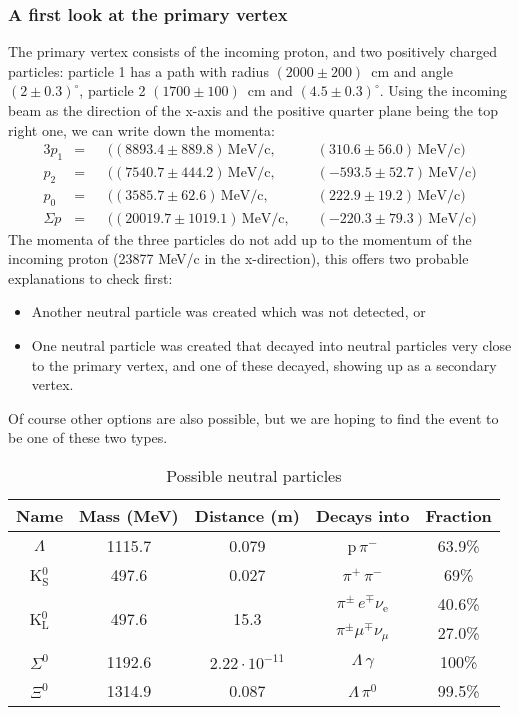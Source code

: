 \documentclass[twocolumn]{article}
\begin{document}
\subsubsection{A first look at the primary vertex}
The primary vertex consists of the incoming proton, and two positively charged particles: particle 1 has a path with radius $(2000 \pm 200)$~cm and angle $(2 \pm 0.3)^{\circ}$, particle 2 $(1700 \pm 100)$~cm and $(4.5 \pm 0.3)^{\circ}$. Using the incoming beam as the direction of the x-axis and the positive quarter plane being the top right one, we can write down the momenta:
\begin{alignat*}{3}
p_1 &= &&((8893.4 \pm 889.8)\, \text{MeV/c},\hspace{3pt} && (310.6 \pm 56.0)\, \text{MeV/c})\\
p_2 &= &&((7540.7 \pm 444.2)\, \text{MeV/c},\hspace{3pt} && (-593.5 \pm 52.7)\, \text{MeV/c})\\
p_0 &= &&((3585.7 \pm 62.6)\, \text{MeV/c},\hspace{3pt} && (222.9 \pm 19.2)\, \text{MeV/c})\\[6pt]
\Sigma p &= &&((20019.7 \pm 1019.1)\, \text{MeV/c},\hspace{3pt} && (-220.3 \pm 79.3)\, \text{MeV/c})
\end{alignat*}
The momenta of the three particles do not add up to the momentum of the incoming proton (23877 MeV/c in the x-direction), this offers two probable explanations to check first:
\begin{itemize}
\item Another neutral particle was created which was not detected, or
\item One neutral particle was created that decayed into neutral particles very close to the primary vertex, and one of these decayed, showing up as a secondary vertex.
\end{itemize}
Of course other options are also possible, but we are hoping to find the event to be one of these two types.\\
\begin{table}
\centering
\begin{tabular}{|c|c|c|c|c|}
\hline
Name & Mass (MeV) & Distance (m) & Decays into & Fraction \\
\hline
$\Lambda$ 	& 1115.7 & 0.079 &p$\, \pi^-$ & 63.9\%\\
\hline
K$^0_{\text{S}}$	 & 497.6 & 0.027 & $\pi^+ \, \pi^-$ & 69\%\\
\hline
\multirow{2}{*}{K$^0_{\text{L}}$} &  \multirow{2}{*}{ 497.6}& \multirow{2}{*}{15.3}&$\pi^{\pm} \, e^{\mp} \nu_{\text{e}}$ & 40.6\%\\
 & & &$\pi^{\pm} \mu ^{\mp} \nu_{\mu}$&27.0\%\\
\hline
$\Sigma^0$ & 1192.6 & $2.22 \cdot 10^{-11}$& $\Lambda \, \gamma$ & 100\%\\
\hline
$\Xi^0$ & 1314.9 & 0.087 & $\Lambda \, \pi^0$ & 99.5\%\\
\hline
\end{tabular}
\caption{Possible neutral particles\cite{pdg}}
\label{tab:neutral}
\end{table}
\end{document}
